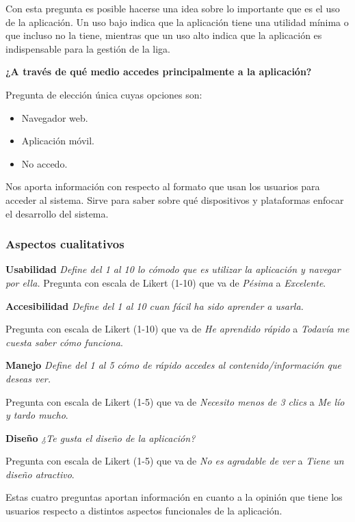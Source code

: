 Con esta pregunta es posible hacerse una idea sobre lo importante que es el uso de la aplicación. Un uso bajo indica que la aplicación tiene una utilidad mínima o que incluso no la tiene, mientras que un uso alto indica que la aplicación es indispensable para la gestión de la liga.

\textbf{¿A través de qué medio accedes principalmente a la aplicación?}

Pregunta de elección única cuyas opciones son:

\begin{itemize}
    \item Navegador web.
    \item Aplicación móvil.
    \item No accedo.
\end{itemize}

Nos aporta información con respecto al formato que usan los usuarios para acceder al sistema. Sirve para saber sobre qué dispositivos y plataformas enfocar el desarrollo del sistema. 

\subsubsection*{Aspectos cualitativos}

\textbf{Usabilidad}
\emph{Define del 1 al 10 lo cómodo que es utilizar la aplicación y navegar por ella.}
Pregunta con escala de Likert \cite{Likert1932} (1-10) que va de \emph{Pésima} a \emph{Excelente}.

\textbf{Accesibilidad}
\emph{Define del 1 al 10 cuan fácil ha sido aprender a usarla.}

Pregunta con escala de Likert (1-10) que va de \emph{He aprendido rápido} a \emph{Todavía me cuesta saber cómo funciona}.

\textbf{Manejo}
\emph{Define del 1 al 5 cómo de rápido accedes al contenido/información que deseas ver.}

Pregunta con escala de Likert (1-5) que va de \emph{Necesito menos de 3 clics} a \emph{Me lío y tardo mucho}.

\textbf{Diseño}
\emph{¿Te gusta el diseño de la aplicación?}

Pregunta con escala de Likert (1-5) que va de \emph{No es agradable de ver} a \emph{Tiene un diseño atractivo}.

Estas cuatro preguntas aportan información en cuanto a la opinión que tiene los usuarios respecto a distintos aspectos funcionales de la aplicación.

